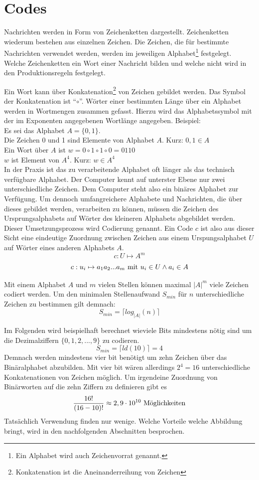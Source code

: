 \documentclass[11pt,a4paper]{scrreprt}
\begin{document}
\chapter{Codes}
Nachrichten werden in Form von Zeichenketten dargestellt. Zeichenketten wiederum bestehen aus einzelnen Zeichen. Die Zeichen, die für bestimmte Nachrichten verwendet werden, werden im jeweiligen Alphabet\footnote{Ein Alphabet wird auch Zeichenvorrat genannt.} festgelegt. Welche Zeichenketten ein Wort einer Nachricht bilden und welche nicht wird in den Produktionsregeln festgelegt.

Ein Wort kann über Konkatenation\footnote{Konkatenation ist die Aneinanderreihung von Zeichen} von Zeichen gebildet werden. Das Symbol der Konkatenation ist "`$\circ$"'. Wörter einer bestimmten Länge über ein Alphabet werden in Wortmengen zusammen gefasst. Hierzu wird das Alphabetssymbol mit der im Exponenten angegebenen Wortlänge angegeben.
Beispiel: \\
Es sei das Alphabet $A = \{0, 1\}$. \\
Die Zeichen 0 und 1 sind Elemente von Alphabet $A$. Kurz: $0,1 \in A$ \\
Ein Wort über $A$ ist $w = 0 \circ 1 \circ 1 \circ 0 = 0110$ \\
$w$ ist Element von $A^4$. Kurz: $w \in A^4$ \\

In der Praxis ist das zu verarbeitende Alphabet oft länger als das technisch verfügbare Alphabet. Der Computer kennt auf unterster Ebene nur zwei unterschiedliche Zeichen. Dem Computer steht also ein binäres Alphabet zur Verfügung. Um dennoch umfangreichere Alphabete und Nachrichten, die über dieses gebildet werden, verarbeiten zu können, müssen die Zeichen des Ursprungsalphabets auf Wörter des kleineren Alphabets abgebildet werden. Dieser Umsetzungsprozess wird Codierung genannt. Ein Code $c$ ist also aus dieser Sicht eine eindeutige Zuordnung zwischen Zeichen aus einem Urspungsalphabet $U$ auf Wörter eines anderen Alphabets $A$.
$$c: U \mapsto A^m$$
$$c: u_i \mapsto a_1a_2...a_m 
	\textnormal{ mit } u_i \in U \wedge a_i \in A$$

Mit einem Alphabet $A$ und $m$ vielen Stellen können maximal $|A|^m$ viele Zeichen codiert werden. Um den minimalen Stellenaufwand $S_{min}$ für $n$ unterschiedliche Zeichen zu bestimmen gilt demnach:
$$ S_{min} = \lceil log_{|A|}(n) \rceil $$

Im Folgenden wird beispielhaft berechnet wieviele Bits mindestens nötig sind um die Dezimalziffern $\{0,1,2, ... , 9\}$ zu codieren.
$$S_{min} = \lceil ld(10) \rceil = 4$$
Demnach werden mindestens vier bit benötigt um zehn Zeichen über das Binäralphabet abzubilden. Mit vier bit wären allerdings $2^4 = 16$ unterschiedliche Konkatenationen von Zeichen möglich. Um irgendeine Zuordnung von Binärworten auf die zehn Ziffern zu definieren gibt es 
$$ \frac{16!}{(16 - 10)!} \approx 2,9 \cdot 10^{10} \textnormal{ Möglichkeiten} $$
Tatsächlich Verwendung finden nur wenige. Welche Vorteile welche Abbildung bringt, wird in den nachfolgenden Abschnitten besprochen.
\end{document}

